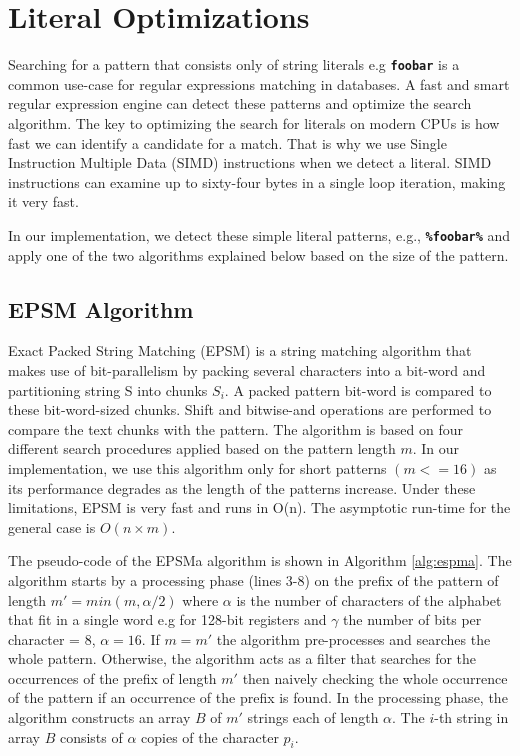 \section{Literal Optimizations}\label{section:simdopt}
Searching for a pattern that consists only of string literals e.g \texttt{\textbf{foobar}} is a common use-case for regular expressions matching in databases. A fast and smart regular expression engine can detect these patterns and optimize the search algorithm. The key to optimizing the search for literals on modern CPUs is how fast we can identify a candidate for a match. That is why we use Single Instruction Multiple Data (SIMD) instructions when we detect a literal. SIMD instructions can examine up to sixty-four bytes in a single loop iteration, making it very fast.

In our implementation, we detect these simple literal patterns, e.g., \texttt{\textbf{\%foobar\%}} and apply one of the two algorithms explained below based on the size of the pattern.

\subsection{EPSM Algorithm}
Exact Packed String Matching (EPSM) \cite{epsm} is a string matching algorithm that makes use of bit-parallelism by packing several characters into a bit-word and partitioning string S into chunks $S_i$. A packed pattern bit-word is compared to these bit-word-sized chunks. Shift and bitwise-and operations are performed to compare the text chunks with the pattern. The algorithm is based on four different search procedures applied based on the pattern length $m$. In our implementation, we use this algorithm only for short patterns $(m <= 16)$ as its performance degrades as the length of the patterns increase. Under these limitations, EPSM is very fast and runs in O(n). The asymptotic run-time for the general case is $O(n \times m)$.

The pseudo-code of the EPSMa algorithm is shown in Algorithm \ref{alg:espma}. The algorithm starts by a processing phase (lines 3-8) on the prefix of the pattern of length $m' = min(m, \alpha/2)$ where $\alpha$ is the number of characters of the alphabet that fit in a single word e.g for 128-bit registers and $\gamma$ the number of bits per character = 8, $\alpha = 16$. If $m = m'$ the algorithm pre-processes and searches the whole pattern. Otherwise, the algorithm acts as a filter that searches for the occurrences of the prefix of length $m'$ then naively checking the whole occurrence of the pattern if an occurrence of the prefix is found. In the processing phase, the algorithm  constructs an array $B$ of $m'$ strings each of length $\alpha$. The $i$-th string in array $B$ consists of $\alpha$ copies of the character $p_i$.

